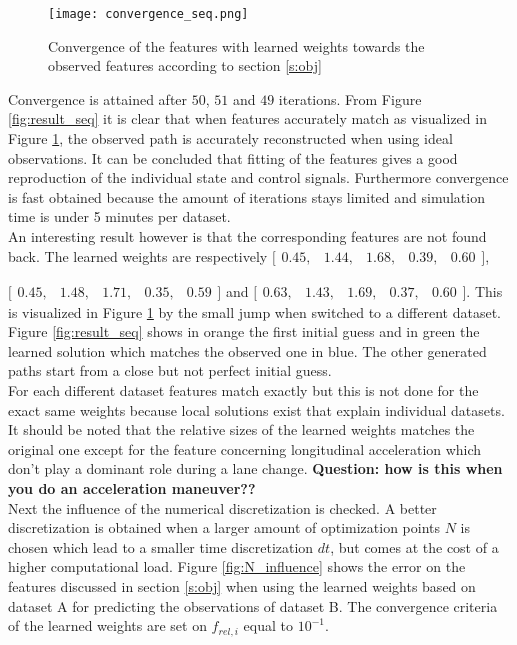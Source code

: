 \begin{figure}[h!]
	\centering
	\texttt{[image: convergence\_seq.png]}
	\caption{Convergence of the features with learned weights towards the observed features according to section \ref{s:obj}}
	\label{fig:convergence_seq}
\end{figure}

Convergence is attained after $50$, $51$ and $49$ iterations. From Figure \ref{fig:result_seq} it is clear that when features accurately match as visualized in Figure \ref{fig:convergence_seq}, the observed path is accurately reconstructed when using ideal observations. It can be concluded that fitting of the features gives a good reproduction of the individual state and control signals. Furthermore convergence is fast obtained because the amount of iterations stays limited and simulation time is under 5 minutes per dataset.\\

 An interesting result however is that the corresponding features are not found back. The learned weights are respectively $\bigl[ \begin{smallmatrix} 0.45  ,&1.44 ,&1.68 ,&0.39,&0.60\end{smallmatrix}\bigr]$, 
 
 $\bigl[ \begin{smallmatrix} 0.45  ,&1.48 ,&1.71 ,&0.35,&0.59\end{smallmatrix}\bigr]$ and $\bigl[ \begin{smallmatrix} 0.63  ,&1.43 ,&1.69 ,&0.37,&0.60\end{smallmatrix}\bigr]$. This is visualized in Figure \ref{fig:convergence_seq} by the small jump when switched to a different dataset. Figure \ref{fig:result_seq} shows in orange the first initial guess and in green the learned solution which matches the observed one in blue. The other generated paths start from a close but not perfect initial guess.\\
 
 For each different dataset features match exactly but this is not done for the exact same weights because local solutions exist that explain individual datasets. It should be noted that the relative sizes of the learned weights matches the original one except for the feature concerning longitudinal acceleration which don't play a dominant role during a lane change. \textbf{Question: how is this when you do an acceleration maneuver??}\\
 
 Next the influence of the numerical discretization is checked. A better discretization is obtained when a larger amount of optimization points $N$ is chosen which lead to a smaller time discretization $dt$, but comes at the cost of a higher computational load. Figure \ref{fig:N_influence} shows the error on the features discussed in section \ref{s:obj} when using the learned weights based on dataset A for predicting the observations of dataset B. The convergence criteria of the learned weights are set on $f_{rel,i}$ equal to $10^{-1}$.\\
 
